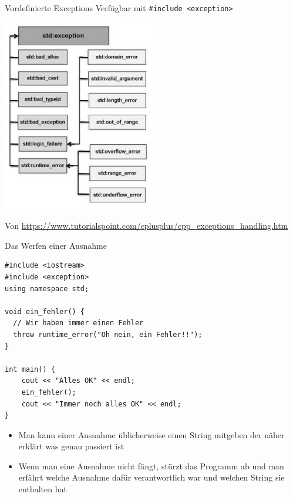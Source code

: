 \documentclass[presentation]{beamer}
\begin{document}
\begin{frame}[label={sec:org48e7459},fragile]{Vordefinierte Exceptions}
 Verfügbar mit {\color{solarizedYellow}\texttt{\#include <exception>}}
\begin{center}\begin{center}
\includegraphics[width=0.5\textwidth]{img/cpp_exceptions.jpg}
\end{center}\end{center}
\tiny
Von \url{https://www.tutorialspoint.com/cplusplus/cpp\_exceptions\_handling.htm}
\end{frame}
\begin{frame}[label={sec:org0f3206c},fragile]{Das Werfen einer Ausnahme}
 \begin{verbatim}
#include <iostream>
#include <exception>
using namespace std;

void ein_fehler() {
  // Wir haben immer einen Fehler
  throw runtime_error("Oh nein, ein Fehler!!");
}

int main() {
    cout << "Alles OK" << endl;
    ein_fehler();
    cout << "Immer noch alles OK" << endl;
}
\end{verbatim}
\begin{itemize}
\item Man kann einer Ausnahme üblicherweise einen \alert{String} mitgeben der
\alert{näher erklärt} was genau passiert ist
\item Wenn man eine \alert{Ausnahme nicht fängt}, \alert{stürzt das Programm ab} und
man erfährt welche Ausnahme dafür verantwortlich war und welchen
String sie enthalten hat
\end{itemize}
\end{frame}
\end{document}
